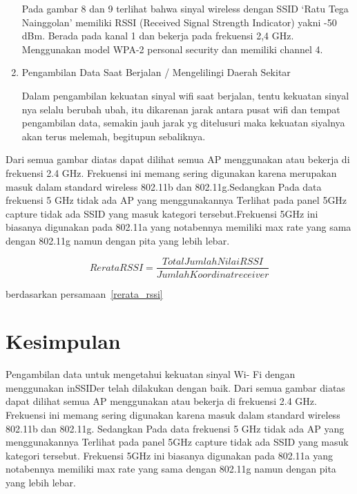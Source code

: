 \documentclass[conference]{IEEEtran}
\begin{document}
\begin{enumerate}
\vspace{0.2cm}

Pada gambar 8 dan 9 terlihat bahwa sinyal wireless
dengan SSID ‘Ratu Tega Nainggolan’ memiliki RSSI (Received Signal Strength Indicator) yakni -50 dBm.
Berada pada kanal 1 dan bekerja pada frekuensi 2,4
GHz. Menggunakan model WPA-2 personal security dan
memiliki channel 4.
\vspace{0.2cm}

    \item Pengambilan Data Saat Berjalan / Mengelilingi Daerah
    Sekitar

\vspace{0.2cm}

Dalam pengambilan kekuatan sinyal wifi saat berjalan,
tentu kekuatan sinyal nya selalu berubah ubah, itu
dikarenan jarak antara pusat wifi dan tempat pengambilan
data, semakin jauh jarak yg ditelusuri maka kekuatan
siyalnya akan terus melemah, begitupun sebaliknya.
\end{enumerate}

\vspace{0.2cm}
Dari semua gambar diatas dapat dilihat semua AP menggunakan
atau bekerja di frekuensi 2.4 GHz. Frekuensi
ini memang sering digunakan karena merupakan masuk
dalam standard wireless 802.11b dan 802.11g.Sedangkan
Pada data frekuensi 5 GHz tidak ada AP yang
menggunakannya Terlihat pada panel 5GHz capture
tidak ada SSID yang masuk kategori tersebut.Frekuensi
5GHz ini biasanya digunakan pada 802.11a yang notabennya
memiliki max rate yang sama dengan 802.11g
namun dengan pita yang lebih lebar.


\begin{equation}
    Rerata RSSI = \frac{Total Jumlah Nilai RSSI}{Jumlah Koordinat receiver}
    \label{rerata_rssi}
\end{equation}

berdasarkan persamaan~\ref{rerata_rssi}

\section{Kesimpulan}
Pengambilan data untuk mengetahui kekuatan sinyal Wi-
Fi dengan menggunakan inSSIDer telah dilakukan dengan
baik. Dari semua gambar diatas dapat dilihat semua AP
menggunakan atau bekerja di frekuensi 2.4 GHz. Frekuensi ini
memang sering digunakan karena masuk dalam standard wireless
802.11b dan 802.11g. Sedangkan Pada data frekuensi 5 GHz tidak ada AP yang menggunakannya Terlihat pada panel
5GHz capture tidak ada SSID yang masuk kategori tersebut.
Frekuensi 5GHz ini biasanya digunakan pada 802.11a yang
notabennya memiliki max rate yang sama dengan 802.11g
namun dengan pita yang lebih lebar.
\end{document}
